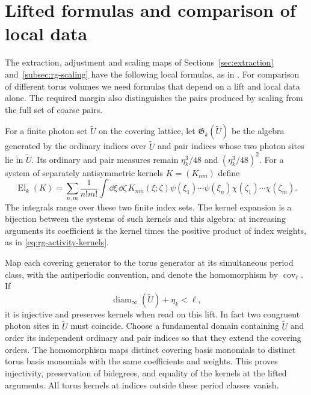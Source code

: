 \section{Lifted formulas and comparison of local data}
\label{subsec:rg-local-pullback}

The extraction, adjustment and scaling maps of
Sections~\ref{sec:extraction} and~\ref{subsec:rg-scaling}
have the following local formulas, as in
\cite[\S12.9]{QED3Manuscript}. For comparison of different torus volumes we
need formulas that depend on a lift and local data alone.
The required margin also distinguishes the pairs produced
by scaling from the full set of coarse pairs.

For a finite photon set $\widetilde U$ on the covering
lattice, let $\mathfrak G_k(\widetilde U)$ be the algebra
generated by the ordinary indices over $\widetilde U$
and pair indices whose two photon sites lie in
$\widetilde U$. Its ordinary and pair measures remain
$\eta_k^3/48$ and $(\eta_k^3/48)^2$. For a system of
separately antisymmetric kernels $K=(K_{nm})$ define
\[
 \operatorname{El}_k(K)
   =\sum_{n,m}\frac1{n!m!}\int\dd\xi\,\dd\zeta\,
                 K_{nm}(\xi;\zeta)\psi(\xi_1)\cdots\psi(\xi_n)
                                    \chi(\zeta_1)\cdots\chi(\zeta_m).
\]
The integrals range over these two finite index sets.
The kernel expansion is a bijection between the systems
of such kernels and this algebra: at increasing arguments
its coefficient is the kernel times the positive product
of index weights, as in \eqref{eq:rg-activity-kernels}.

Map each covering generator to the torus generator at
its simultaneous period class, with the antiperiodic
convention, and denote the homomorphism by
$\operatorname{cov}_\ell$. If
\begin{equation}\label{eq:rg-generator-pullback-margin}
 \operatorname{diam}_\infty(\widetilde U)+\eta_k<\ell,
\end{equation}
it is injective and preserves kernels when read on this
lift. In fact two congruent photon sites in
$\widetilde U$ must coincide. Choose a fundamental
domain containing $\widetilde U$ and order its
independent ordinary and pair indices so that they
extend the covering orders. The homomorphism maps
distinct covering basis monomials to distinct torus
basis monomials with the same coefficients and weights.
This proves injectivity, preservation of bidegrees,
and equality of the kernels at the lifted arguments.
All torus kernels at indices outside these period
classes vanish.

